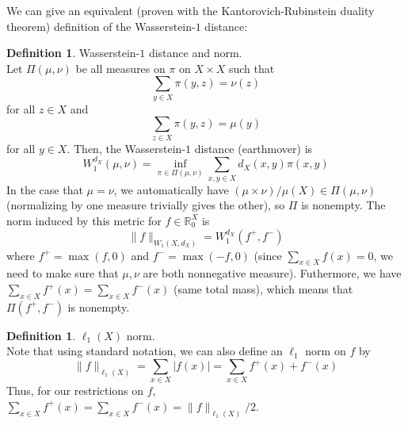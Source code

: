 \documentclass[10pt]{article}
\theoremstyle{definition}
\newtheorem{definition}[theorem]{Definition}
\theoremstyle{definition}
\theoremstyle{definition}
\theoremstyle{definition}
\newcommand{\R}
{\mathbb{R}}
\begin{document}
We can give an equivalent (proven with the Kantorovich-Rubinstein duality theorem) definition of the Wasserstein-$1$ distance:
\begin{definition} Wasserstein-$1$ distance and norm. \\
Let $\Pi(\mu, \nu)$ be all measures on $\pi$ on $X \times X$ such that 
\[
\sum_{y \in X} \pi(y, z) = \nu(z)
\]
for all $z \in X$
and 
\[
\sum_{z \in X} \pi(y, z) = \mu(y)
\]
for all $y \in X$. Then, the Wasserstein-$1$ distance (earthmover) is 
\[
W_1^{d_X}(\mu, \nu) = \inf_{\pi \in \Pi(\mu, \nu)} \sum_{x, y \in X} d_X(x, y) \pi(x, y)
\]
In the case that $\mu = \nu$, we automatically have $(\mu \times \nu)/\mu(X) \in \Pi(\mu, \nu)$ (normalizing by one measure trivially gives the other), so $\Pi$ is nonempty.
The norm induced by this metric for $f \in \R_0^X$ is
\[
\|f\|_{W_1(X, d_X)} = W_1^{d_X}(f^+, f^-)
\]
where $f^+ = \max(f, 0)$ and $f^- = \max(-f, 0)$ (since $\sum_{x \in X} f(x) = 0$, we need to make sure that $\mu, \nu$ are both nonnegative measure).
Futhermore, we have $\sum_{x \in X} f^+(x) = \sum_{x \in X} f^-(x)$ (same total mass), which means that $\Pi(f^+, f^-)$ is nonempty.
\end{definition}

\begin{definition} $\ell_1(X)$ norm. \\
Note that using standard notation, we can also define an $\ell_1$ norm on $f$ by 
\[
\|f\|_{\ell_1(X)} = \sum_{x \in X} |f(x)| = \sum_{x \in X} f^+(x) + f^-(x)
\]
Thus, for our restrictions on $f$, $\sum_{x \in X} f^+(x) = \sum_{x \in X} f^-(x) = \|f\|_{\ell_1(X)}/2$.
\end{definition}
\end{document}
